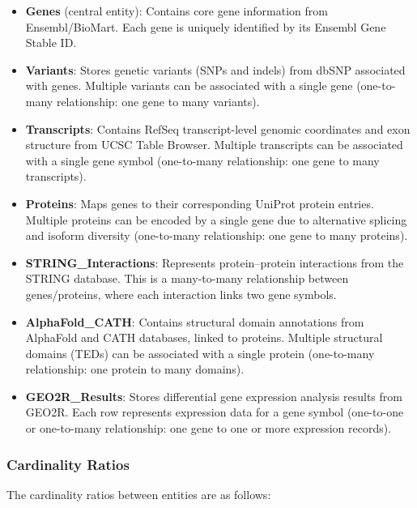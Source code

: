\documentclass[11pt]{article}
\begin{document}
\begin{itemize}
	\item \textbf{Genes} (central entity): Contains core gene information from Ensembl/BioMart. Each gene is uniquely identified by its Ensembl Gene Stable ID.
	
	\item \textbf{Variants}: Stores genetic variants (SNPs and indels) from dbSNP associated with genes. Multiple variants can be associated with a single gene (one-to-many relationship: one gene to many variants).
	
	\item \textbf{Transcripts}: Contains RefSeq transcript-level genomic coordinates and exon structure from UCSC Table Browser. Multiple transcripts can be associated with a single gene symbol (one-to-many relationship: one gene to many transcripts).
	
	\item \textbf{Proteins}: Maps genes to their corresponding UniProt protein entries. Multiple proteins can be encoded by a single gene due to alternative splicing and isoform diversity (one-to-many relationship: one gene to many proteins).
	
	\item \textbf{STRING\_Interactions}: Represents protein--protein interactions from the STRING database. This is a many-to-many relationship between genes/proteins, where each interaction links two gene symbols.
	
	\item \textbf{AlphaFold\_CATH}: Contains structural domain annotations from AlphaFold and CATH databases, linked to proteins. Multiple structural domains (TEDs) can be associated with a single protein (one-to-many relationship: one protein to many domains).
	
	\item \textbf{GEO2R\_Results}: Stores differential gene expression analysis results from GEO2R. Each row represents expression data for a gene symbol (one-to-one or one-to-many relationship: one gene to one or more expression records).
\end{itemize}

\subsubsection{Cardinality Ratios}

The cardinality ratios between entities are as follows:
\end{document}
